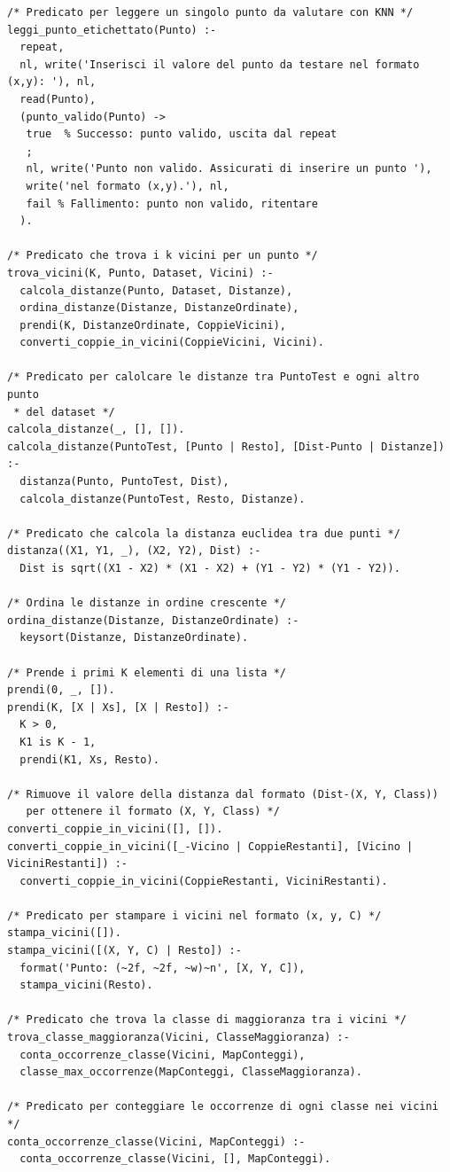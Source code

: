 \documentclass[11pt]{article}
\theoremstyle{definition}
\begin{document}
\begin{verbatim}
/* Predicato per leggere un singolo punto da valutare con KNN */
leggi_punto_etichettato(Punto) :-
  repeat,
  nl, write('Inserisci il valore del punto da testare nel formato (x,y): '), nl,
  read(Punto),
  (punto_valido(Punto) ->
   true  % Successo: punto valido, uscita dal repeat
   ;
   nl, write('Punto non valido. Assicurati di inserire un punto '),
   write('nel formato (x,y).'), nl,
   fail % Fallimento: punto non valido, ritentare
  ).

/* Predicato che trova i k vicini per un punto */
trova_vicini(K, Punto, Dataset, Vicini) :-
  calcola_distanze(Punto, Dataset, Distanze),
  ordina_distanze(Distanze, DistanzeOrdinate),
  prendi(K, DistanzeOrdinate, CoppieVicini),
  converti_coppie_in_vicini(CoppieVicini, Vicini).

/* Predicato per calolcare le distanze tra PuntoTest e ogni altro punto 
 * del dataset */
calcola_distanze(_, [], []).
calcola_distanze(PuntoTest, [Punto | Resto], [Dist-Punto | Distanze]) :-
  distanza(Punto, PuntoTest, Dist),
  calcola_distanze(PuntoTest, Resto, Distanze).
  
/* Predicato che calcola la distanza euclidea tra due punti */
distanza((X1, Y1, _), (X2, Y2), Dist) :-
  Dist is sqrt((X1 - X2) * (X1 - X2) + (Y1 - Y2) * (Y1 - Y2)).

/* Ordina le distanze in ordine crescente */
ordina_distanze(Distanze, DistanzeOrdinate) :-
  keysort(Distanze, DistanzeOrdinate).

/* Prende i primi K elementi di una lista */
prendi(0, _, []).
prendi(K, [X | Xs], [X | Resto]) :-
  K > 0,
  K1 is K - 1,
  prendi(K1, Xs, Resto).
  
/* Rimuove il valore della distanza dal formato (Dist-(X, Y, Class)) 
   per ottenere il formato (X, Y, Class) */
converti_coppie_in_vicini([], []).
converti_coppie_in_vicini([_-Vicino | CoppieRestanti], [Vicino | ViciniRestanti]) :-
  converti_coppie_in_vicini(CoppieRestanti, ViciniRestanti).
  
/* Predicato per stampare i vicini nel formato (x, y, C) */
stampa_vicini([]).
stampa_vicini([(X, Y, C) | Resto]) :-
  format('Punto: (~2f, ~2f, ~w)~n', [X, Y, C]),
  stampa_vicini(Resto).
  
/* Predicato che trova la classe di maggioranza tra i vicini */
trova_classe_maggioranza(Vicini, ClasseMaggioranza) :-
  conta_occorrenze_classe(Vicini, MapConteggi),
  classe_max_occorrenze(MapConteggi, ClasseMaggioranza).

/* Predicato per conteggiare le occorrenze di ogni classe nei vicini */
conta_occorrenze_classe(Vicini, MapConteggi) :-
  conta_occorrenze_classe(Vicini, [], MapConteggi).


\end{verbatim}
\end{document}
